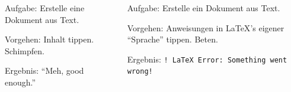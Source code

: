 \begin{frame}[fragile]
\begin{columns}
    \begin{column}{0.5\textwidth}
      \begin{center}
        \resizebox{0.25\linewidth}{!}{\LaTeX}
      \end{center}
    \end{column}
      
  \end{columns}
  
  \begin{columns}[t]

    \begin{column}{0.5\textwidth}
      \begin{block}{Aufgabe:}
        Erstelle eine Dokument aus Text.
      \end{block}
      \begin{block}{Vorgehen:}
          Inhalt tippen. Schimpfen.
      \end{block}
      \begin{block}{Ergebnis:}
        ``Meh, good enough.''
      \end{block}
    \end{column}

    \begin{column}{0.5\textwidth}
      
      \begin{block}{Aufgabe:}
        Erstelle ein Dokument aus Text.
      \end{block}
      \begin{block}{Vorgehen:}
          Anweisungen in {\LaTeX}'s eigener ``Sprache'' tippen. Beten.
      \end{block}
      \begin{block}{Ergebnis:}
          \alert{\texttt{! LaTeX Error: Something went wrong!}}
      \end{block}
    \end{column}
    
  \end{columns}


\end{frame}
